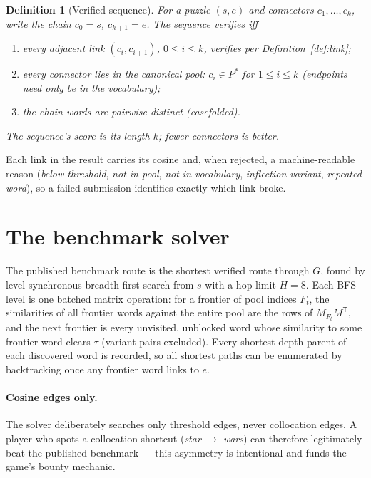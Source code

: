 \documentclass[11pt]{article}
\newtheorem{definition}{Definition}
\newcommand{\thresh}{\tau}
\begin{document}
\begin{definition}[Verified sequence]
For a puzzle $(s, e)$ and connectors $c_1, \dots, c_k$, write the chain
$c_0 = s$, $c_{k+1} = e$. The sequence verifies iff
\begin{enumerate}
  \item every adjacent link $(c_i, c_{i+1})$, $0 \le i \le k$, verifies per
        Definition~\ref{def:link};
  \item every connector lies in the canonical pool: $c_i \in P^\ast$ for
        $1 \le i \le k$ (endpoints need only be in the vocabulary);
  \item the chain words are pairwise distinct (casefolded).
\end{enumerate}
The sequence's score is its length $k$; fewer connectors is better.
\end{definition}
Each link in the result carries its cosine and, when rejected, a machine-readable
reason (\emph{below-threshold}, \emph{not-in-pool}, \emph{not-in-vocabulary},
\emph{inflection-variant}, \emph{repeated-word}), so a failed submission
identifies exactly which link broke.

\section{The benchmark solver}
\label{sec:solver}

The published benchmark route is the shortest verified route through $G$,
found by level-synchronous breadth-first search from $s$ with a hop limit
$H = 8$. Each BFS level is one batched matrix operation: for a frontier of
pool indices $F_t$, the similarities of all frontier words against the entire
pool are the rows of $M_{F_t} M^{\mathsf T}$, and the next frontier is every
unvisited, unblocked word whose similarity to some frontier word clears
$\thresh$ (variant pairs excluded). Every shortest-depth parent of each
discovered word is recorded, so all shortest paths can be enumerated by
backtracking once any frontier word links to $e$.

\paragraph{Cosine edges only.}
The solver deliberately searches only threshold edges, never collocation
edges. A player who spots a collocation shortcut (\emph{star} $\to$
\emph{wars}) can therefore legitimately beat the published benchmark --- this
asymmetry is intentional and funds the game's bounty mechanic.
\end{document}
